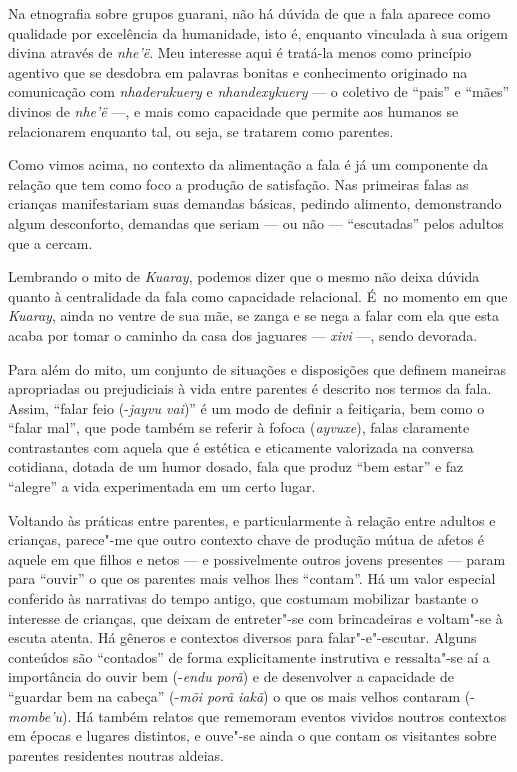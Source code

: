 Na etnografia sobre grupos guarani, não há dúvida de que a fala aparece
como qualidade por excelência da humanidade, isto é, enquanto vinculada
à sua origem divina através de \emph{nhe’ë}. Meu interesse aqui é tratá-la
menos como princípio agentivo que se desdobra em palavras bonitas e
conhecimento originado na comunicação com \emph{nhaderukuery} e \emph{nhandexykuery}
--- o coletivo de ``pais'' e ``mães'' divinos de \emph{nhe’ë} ---, e mais como
capacidade que permite aos humanos se relacionarem enquanto tal, ou
seja, se tratarem como parentes.

Como vimos acima, no contexto da alimentação a fala é já um componente
da relação que tem como foco a produção de satisfação. Nas primeiras
falas as crianças manifestariam suas demandas básicas, pedindo
alimento, demonstrando algum desconforto, demandas que seriam --- ou não
--- ``escutadas'' pelos adultos que a cercam. 

Lembrando o mito de \emph{Kuaray}, podemos dizer que o mesmo não deixa dúvida
quanto à centralidade da fala como capacidade relacional. É~no momento
em que \emph{Kuaray}, ainda no ventre de sua mãe, se zanga e se nega a falar
com ela que esta acaba por tomar o caminho da casa dos jaguares --- \emph{xivi}
---, sendo devorada.

Para além do mito, um conjunto de situações e disposições que definem
maneiras apropriadas ou prejudiciais à vida entre parentes é descrito
nos termos da fala. Assim, ``falar feio (-\emph{jayvu vai})'' é um modo de
definir a feitiçaria, bem como o ``falar mal'', que pode também se
referir à fofoca (\emph{ayvuxe}), falas claramente contrastantes com aquela
que é estética e eticamente valorizada na conversa cotidiana, dotada de
um humor dosado, fala que produz ``bem estar'' e faz ``alegre'' a vida
experimentada em um certo lugar.

Voltando às práticas entre parentes, e particularmente à relação entre
adultos e crianças, parece"-me que outro contexto chave de produção
mútua de afetos é aquele em que filhos e netos --- e possivelmente outros
jovens presentes --- param para ``ouvir'' o que os parentes mais velhos lhes
``contam''. Há um valor especial conferido às narrativas do tempo antigo,
que costumam mobilizar bastante o interesse de crianças, que deixam de
entreter"-se com brincadeiras e voltam"-se à escuta atenta. Há gêneros e
contextos diversos para falar"-e"-escutar. Alguns conteúdos são ``contados''
de forma explicitamente instrutiva e ressalta"-se aí a importância do
ouvir bem (-\emph{endu porã}) e de desenvolver a capacidade de ``guardar bem na
cabeça'' (-\emph{mõi porã iakã}) o que os mais velhos contaram (-\emph{mombe’u}). Há
também relatos que rememoram eventos vividos noutros contextos em
épocas e lugares distintos, e ouve"-se ainda o que contam os visitantes
sobre parentes residentes noutras aldeias.

